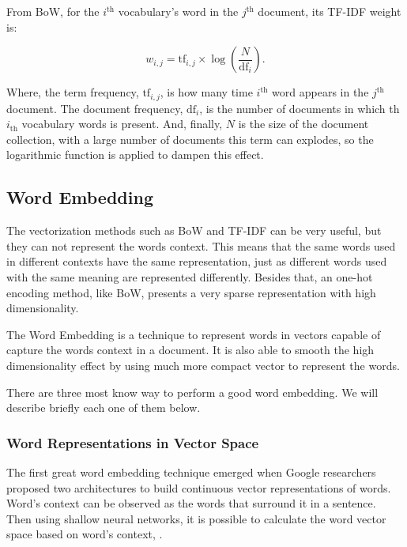 	From BoW, for the $i^{\text{th}}$ vocabulary's word in the $j^{\text{th}}$ document, its TF-IDF weight is:
	
	\begin{equation}
	\label{eq:tf-idf}
	w_{i, j} = \text{tf}_{i, j} \times \log\left(\dfrac{N}{\text{df}_{i}}\right) \text{.}
	\end{equation}
	
	Where, the term frequency, $\text{tf}_{i, j}$, is how many time $i^{\text{th}}$ word appears in the $j^{\text{th}}$ document. The document frequency, $\text{df}_{i}$, is the number of documents in which th $i_{\text{th}}$ vocabulary words is present. And, finally, $N$ is the size of the document collection, with a large number of documents this term can explodes, so the logarithmic function is applied to dampen this effect.
	
	\subsection{Word Embedding}
	
	The vectorization methods such as BoW and TF-IDF can be very useful, but they can not represent the words context. This means that the same words used in different contexts have the same representation, just as different words used with the same meaning are represented differently. Besides that, an one-hot encoding method, like BoW, presents a very sparse representation with high dimensionality. 
	
	The Word Embedding is a technique to represent words in vectors capable of capture the words context in a document. It is also able to smooth the high dimensionality effect by using much more compact vector to represent the words.	
	
	There are three most know way to perform a good word embedding. We will describe briefly each one of them below. 
	
	\subsubsection{Word Representations in Vector Space} %
	
	The first great word embedding technique emerged when Google researchers proposed two architectures to build continuous vector representations of words. Word's context can be observed as the words that surround it in a sentence. Then using shallow neural networks, it is possible to calculate the word vector space based on word's context, \cite{mikolov2013efficient}.
	

